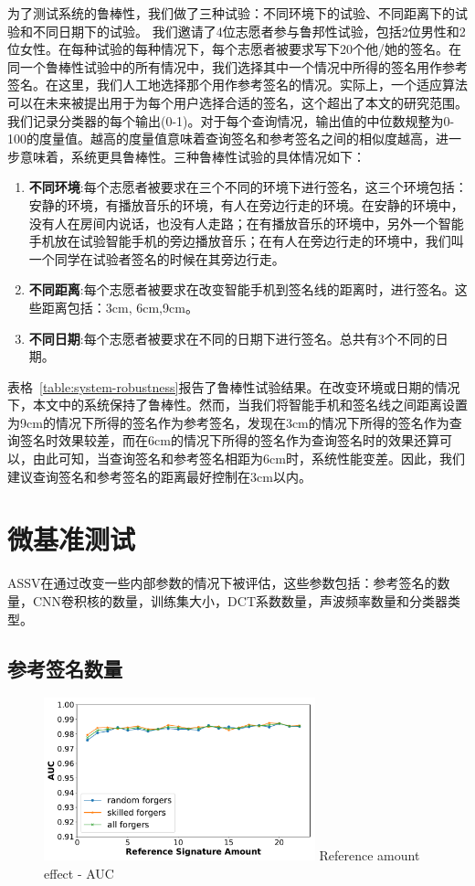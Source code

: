 为了测试系统的鲁棒性，我们做了三种试验：不同环境下的试验、不同距离下的试验和不同日期下的试验。 我们邀请了4位志愿者参与鲁邦性试验，包括2位男性和2位女性。在每种试验的每种情况下，每个志愿者被要求写下20个他/她的签名。在同一个鲁棒性试验中的所有情况中，我们选择其中一个情况中所得的签名用作参考签名。在这里，我们人工地选择那个用作参考签名的情况。实际上，一个适应算法可以在未来被提出用于为每个用户选择合适的签名，这个超出了本文的研究范围。我们记录分类器的每个输出(0-1)。对于每个查询情况，输出值的中位数规整为0-100的度量值。越高的度量值意味着查询签名和参考签名之间的相似度越高，进一步意味着，系统更具鲁棒性。三种鲁棒性试验的具体情况如下：

\begin{enumerate}[label=(\arabic*)]
    \item \textbf{不同环境}:每个志愿者被要求在三个不同的环境下进行签名，这三个环境包括：安静的环境，有播放音乐的环境，有人在旁边行走的环境。在安静的环境中，没有人在房间内说话，也没有人走路；在有播放音乐的环境中，另外一个智能手机放在试验智能手机的旁边播放音乐；在有人在旁边行走的环境中，我们叫一个同学在试验者签名的时候在其旁边行走。
    \item \textbf{不同距离}:每个志愿者被要求在改变智能手机到签名线的距离时，进行签名。这些距离包括：3cm, 6cm,9cm。
    \item \textbf{不同日期}:每个志愿者被要求在不同的日期下进行签名。总共有3个不同的日期。
\end{enumerate}

表格~\ref{table:system-robustness}报告了鲁棒性试验结果。在改变环境或日期的情况下，本文中的系统保持了鲁棒性。然而，当我们将智能手机和签名线之间距离设置为9cm的情况下所得的签名作为参考签名，发现在3cm的情况下所得的签名作为查询签名时效果较差，而在6cm的情况下所得的签名作为查询签名时的效果还算可以，由此可知，当查询签名和参考签名相距为6cm时，系统性能变差。因此，我们建议查询签名和参考签名的距离最好控制在3cm以内。


\section{微基准测试}
ASSV在通过改变一些内部参数的情况下被评估，这些参数包括：参考签名的数量，CNN卷积核的数量，训练集大小，DCT系数数量，声波频率数量和分类器类型。

\subsection{参考签名数量}
\begin{figure}
  \centering
  \includegraphics[width=0.7\textwidth]{figure/rcount-auc-lines.pdf}
      {Reference amount effect - AUC}
  \label{fig:rcount-auc-lines}
\end{figure}

